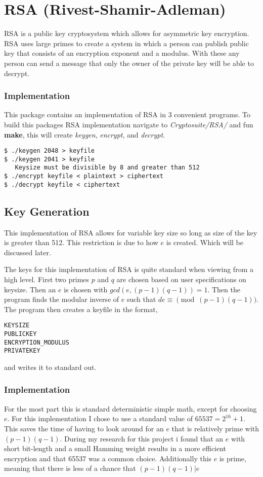 

\chapter{RSA (Rivest-Shamir-Adleman)}

RSA is a public key cryptosystem which allows for asymmetric key encryption.
RSA uses large primes to create a system in which a person can publish public key
that consists of an encryption exponent and a modulus.
With these any person can send a message that only the owner of the private key will be able to decrypt. 

\subsection{Implementation}
This package contains an implementation of RSA in 3 convenient programs.
To build this packages RSA implementation navigate to \textit{Cryptosuite/RSA/} and fun \textbf{make}, this will create \textit{keygen}, \textit{ encrypt}, and \textit{decrypt}.

\begin{verbatim}
$ ./keygen 2048 > keyfile
$ ./keygen 2041 > keyfile
   Keysize must be divisible by 8 and greater than 512
$ ./encrypt keyfile < plaintext > ciphertext
$ ./decrypt keyfile < ciphertext
\end{verbatim}

\section{ Key Generation}

This implementation of  RSA allows for variable key size so long as size of the key is greater than 512. This restriction is due to how $e$ is created. Which will be discussed later.

The keys for this implementation of RSA is quite standard when viewing from a high level.
First two primes $p$ and $q$ are chosen based on user specifications on keysize. Then an $e$ is chosen with $gcd(e,(p-1)(q-1)) = 1$. 
Then the program finds the modular inverse of $e$ such that $de \equiv \pmod{(p-1)(q-1)} $.
The program then creates a keyfile in the format,
\begin{verbatim}
KEYSIZE
PUBLICKEY
ENCRYPTION_MODULUS
PRIVATEKEY
\end{verbatim}
and writes it to standard out.

\subsection{Implementation}
For the most part this is standard deterministic simple math, except for choosing $e$.
For this implementation I chose to use a standard value of $65537 = 2^{16} +1$.
This saves the time of having to look around for an $e$ that is relatively prime with $(p-1)(q-1)$.
During my research for this project i found that an $e$ with short bit-length and a small Hamming weight results in a more efficient encryption and that 65537 was a common choice. 
Additionally this $e$ is prime, meaning that there is less of a chance that $(p-1)(q-1)|e$

